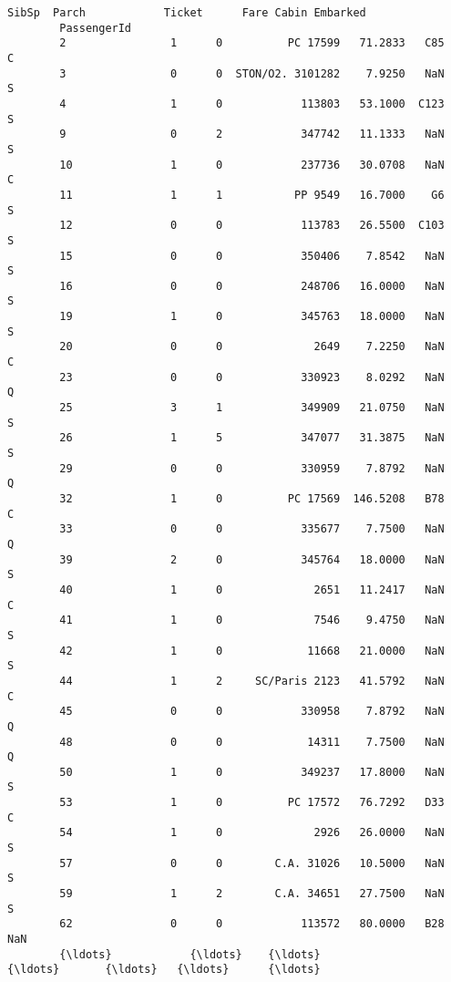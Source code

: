 \documentclass[11pt]{article}
\begin{document}
\begin{Verbatim}[commandchars=\\\{\}]
                     SibSp  Parch            Ticket      Fare Cabin Embarked  
        PassengerId                                                           
        2                1      0          PC 17599   71.2833   C85        C  
        3                0      0  STON/O2. 3101282    7.9250   NaN        S  
        4                1      0            113803   53.1000  C123        S  
        9                0      2            347742   11.1333   NaN        S  
        10               1      0            237736   30.0708   NaN        C  
        11               1      1           PP 9549   16.7000    G6        S  
        12               0      0            113783   26.5500  C103        S  
        15               0      0            350406    7.8542   NaN        S  
        16               0      0            248706   16.0000   NaN        S  
        19               1      0            345763   18.0000   NaN        S  
        20               0      0              2649    7.2250   NaN        C  
        23               0      0            330923    8.0292   NaN        Q  
        25               3      1            349909   21.0750   NaN        S  
        26               1      5            347077   31.3875   NaN        S  
        29               0      0            330959    7.8792   NaN        Q  
        32               1      0          PC 17569  146.5208   B78        C  
        33               0      0            335677    7.7500   NaN        Q  
        39               2      0            345764   18.0000   NaN        S  
        40               1      0              2651   11.2417   NaN        C  
        41               1      0              7546    9.4750   NaN        S  
        42               1      0             11668   21.0000   NaN        S  
        44               1      2     SC/Paris 2123   41.5792   NaN        C  
        45               0      0            330958    7.8792   NaN        Q  
        48               0      0             14311    7.7500   NaN        Q  
        50               1      0            349237   17.8000   NaN        S  
        53               1      0          PC 17572   76.7292   D33        C  
        54               1      0              2926   26.0000   NaN        S  
        57               0      0        C.A. 31026   10.5000   NaN        S  
        59               1      2        C.A. 34651   27.7500   NaN        S  
        62               0      0            113572   80.0000   B28      NaN  
        {\ldots}            {\ldots}    {\ldots}               {\ldots}       {\ldots}   {\ldots}      {\ldots}  

\end{Verbatim}
\end{document}
